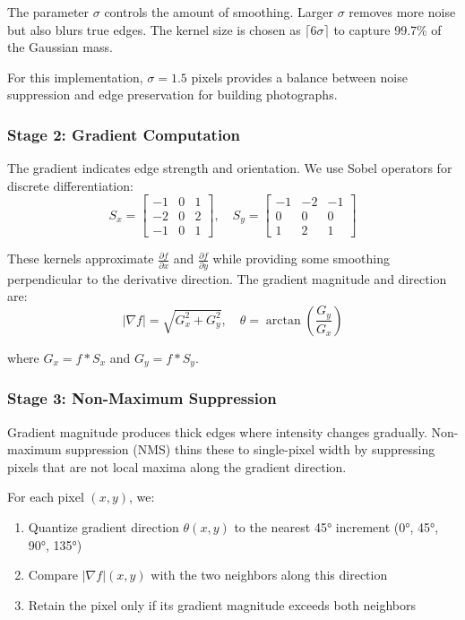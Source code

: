 \documentclass[11pt,a4paper]{article}
\begin{document}
The parameter $\sigma$ controls the amount of smoothing. Larger $\sigma$ removes more noise but also blurs true edges. The kernel size is chosen as $\lceil 6\sigma \rceil$ to capture 99.7\% of the Gaussian mass.

For this implementation, $\sigma = 1.5$ pixels provides a balance between noise suppression and edge preservation for building photographs.

\subsubsection{Stage 2: Gradient Computation}
The gradient indicates edge strength and orientation. We use Sobel operators for discrete differentiation:
$$S_x = \begin{bmatrix} -1 & 0 & 1 \\ -2 & 0 & 2 \\ -1 & 0 & 1 \end{bmatrix}, \quad S_y = \begin{bmatrix} -1 & -2 & -1 \\ 0 & 0 & 0 \\ 1 & 2 & 1 \end{bmatrix}$$

These kernels approximate $\frac{\partial f}{\partial x}$ and $\frac{\partial f}{\partial y}$ while providing some smoothing perpendicular to the derivative direction. The gradient magnitude and direction are:
$$|\nabla f| = \sqrt{G_x^2 + G_y^2}, \quad \theta = \arctan\left(\frac{G_y}{G_x}\right)$$

where $G_x = f * S_x$ and $G_y = f * S_y$.

\subsubsection{Stage 3: Non-Maximum Suppression}
Gradient magnitude produces thick edges where intensity changes gradually. Non-maximum suppression (NMS) thins these to single-pixel width by suppressing pixels that are not local maxima along the gradient direction.

For each pixel $(x,y)$, we:
\begin{enumerate}
    \item Quantize gradient direction $\theta(x,y)$ to the nearest 45° increment (0°, 45°, 90°, 135°)
    \item Compare $|\nabla f|(x,y)$ with the two neighbors along this direction
    \item Retain the pixel only if its gradient magnitude exceeds both neighbors
\end{enumerate}
\end{document}
